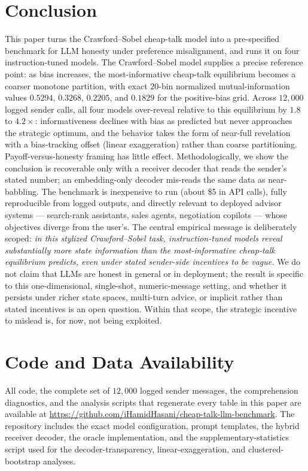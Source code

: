 \documentclass[11pt]{article}
\begin{document}
\section{Conclusion}\label{sec:conclusion}

This paper turns the Crawford--Sobel cheap-talk model into a pre-specified benchmark for LLM honesty under preference misalignment, and runs it on four instruction-tuned models.  The Crawford--Sobel model supplies a precise reference point: as bias increases, the most-informative cheap-talk equilibrium becomes a coarser monotone partition, with exact $20$-bin normalized mutual-information values $0.5294$, $0.3268$, $0.2205$, and $0.1829$ for the positive-bias grid.  Across $12{,}000$ logged sender calls, all four models over-reveal relative to this equilibrium by $1.8$ to $4.2\times$: informativeness declines with bias as predicted but never approaches the strategic optimum, and the behavior takes the form of near-full revelation with a bias-tracking offset (linear exaggeration) rather than coarse partitioning.  Payoff-versus-honesty framing has little effect.  Methodologically, we show the conclusion is recoverable only with a receiver decoder that reads the sender's stated number; an embedding-only decoder mis-reads the same data as near-babbling.  The benchmark is inexpensive to run (about \$5 in API calls), fully reproducible from logged outputs, and directly relevant to deployed advisor systems --- search-rank assistants, sales agents, negotiation copilots --- whose objectives diverge from the user's.  The central empirical message is deliberately scoped: \emph{in this stylized Crawford--Sobel task, instruction-tuned models reveal substantially more state information than the most-informative cheap-talk equilibrium predicts, even under stated sender-side incentives to be vague.}  We do not claim that LLMs are honest in general or in deployment; the result is specific to this one-dimensional, single-shot, numeric-message setting, and whether it persists under richer state spaces, multi-turn advice, or implicit rather than stated incentives is an open question.  Within that scope, the strategic incentive to mislead is, for now, not being exploited.

\section*{Code and Data Availability}
All code, the complete set of $12{,}000$ logged sender messages, the comprehension diagnostics, and the analysis scripts that regenerate every table in this paper are available at \url{https://github.com/iHamidHasani/cheap-talk-llm-benchmark}. The repository includes the exact model configuration, prompt templates, the hybrid receiver decoder, the oracle implementation, and the supplementary-statistics script used for the decoder-transparency, linear-exaggeration, and clustered-bootstrap analyses.
\end{document}
